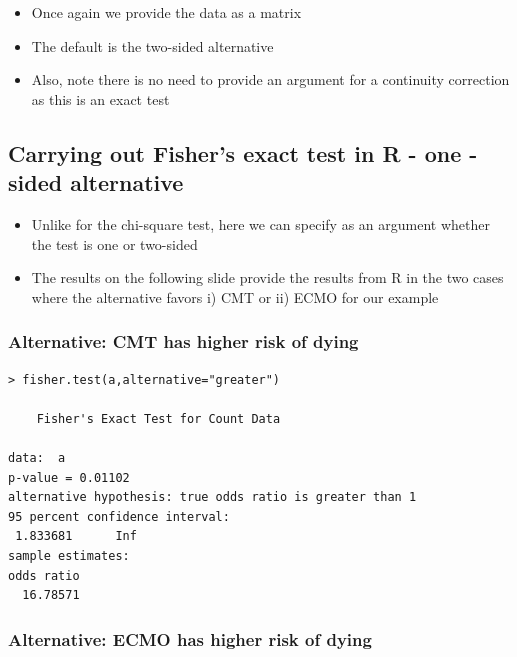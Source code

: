 \documentclass[
]{book}
\providecommand{\tightlist}{%
  \setlength{\itemsep}{0pt}\setlength{\parskip}{0pt}}
\begin{document}
\begin{itemize}
\tightlist
\item
  Once again we provide the data as a matrix
\item
  The default is the two-sided alternative
\item
  Also, note there is no need to provide an argument for a continuity correction as this is an exact test
\end{itemize}

\hypertarget{carrying-out-fishers-exact-test-in-r---one--sided-alternative}{%
\subsection{Carrying out Fisher's exact test in R - one -sided alternative}\label{carrying-out-fishers-exact-test-in-r---one--sided-alternative}}

\begin{itemize}
\tightlist
\item
  Unlike for the chi-square test, here we can specify as an argument whether the test is one or two-sided
\item
  The results on the following slide provide the results from R in the two cases where the alternative favors i) CMT or ii) ECMO for our example
\end{itemize}

\hypertarget{alternative-cmt-has-higher-risk-of-dying}{%
\subsubsection{Alternative: CMT has higher risk of dying}\label{alternative-cmt-has-higher-risk-of-dying}}

\begin{verbatim}
> fisher.test(a,alternative="greater")

    Fisher's Exact Test for Count Data

data:  a
p-value = 0.01102
alternative hypothesis: true odds ratio is greater than 1
95 percent confidence interval:
 1.833681      Inf
sample estimates:
odds ratio 
  16.78571 
\end{verbatim}

\hypertarget{alternative-ecmo-has-higher-risk-of-dying}{%
\subsubsection{Alternative: ECMO has higher risk of dying}\label{alternative-ecmo-has-higher-risk-of-dying}}
\end{document}
